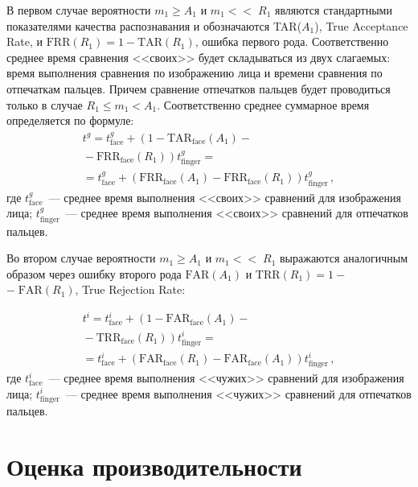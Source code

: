 \begin{multicols}{2}
     В первом случае вероятности $m_1\geq A_1$ и $m_1 <$\linebreak $<\;R_1$ являются
стандартными показателями качества распознавания и обозначаются TAR($A_1$), True
Acceptance Rate, и $\mathrm{FRR}(R_1)=1 - \mathrm{TAR}(R_1)$, 
ошибка первого рода. Соответственно среднее время сравнения <<своих>> будет
складываться из двух слагаемых: время выполнения сравнения по изображению лица и
времени сравнения по отпечаткам пальцев. Причем сравнение отпечатков пальцев
будет проводиться только в случае $R_1 \leq m_1 < A_1$. Соответственно среднее
суммарное время определяется по формуле:
\begin{multline}
 t^g = t^g_{\mathrm{face}} +\left ( 1-\mathrm{TAR}_{\mathrm{face}} (A_1) -{}\right.\\
 {}-\left.
\mathrm{FRR}_{\mathrm{face}} (R_1 )\right )  t^g_{\mathrm{finger}} ={}\\
     {}= t^g_{\mathrm{face}} +\left ( \mathrm{FRR}_{\mathrm{face}} (A_1) -
\mathrm{FRR}_{\mathrm{face}} (R_1)\right ) t^g_{\mathrm{finger}}\,,
     \label{e4ush}
     \end{multline}
где $t^g_{\mathrm{face}}$~--- среднее время выполнения <<своих>> сравнений для
изображения лица; $t^g_{\mathrm{finger}}$~---  среднее время выполнения <<своих>>
сравнений для отпечатков пальцев.


     Во втором случае вероятности $m_1 \geq A_1$ и $m_1<$\linebreak $<\;R_1$ выражаются
аналогичным образом \mbox{через} ошибку второго рода $\mathrm{FAR}(A_1)$ и $\mathrm{TRR}(R_1)=1-$\linebreak
$-\;\mathrm{FAR}(R_1)$, True Rejection Rate:

\noindent
\begin{multline}
     t^i =  t^i_{\mathrm{face}} +\left (1-\mathrm{FAR}_{\mathrm{face}}(A_1)-{}\right.\\
\left. {}-\mathrm{TRR}_{\mathrm{face}}(R_1)\right ) t^i_{\mathrm{finger}} ={}\\
     {}=
     t^i_{\mathrm{face}} + \left ( \mathrm{FAR}_{\mathrm{face}}(R_1)-
\mathrm{FAR}_{\mathrm{face}}(A_1)\right ) t^i_{\mathrm{finger}}\,,
     \label{e5ush}
     \end{multline}
где $t^i_{\mathrm{face}}$~--- среднее время выполнения <<чужих>> сравнений для
изображения лица; $t^i_{\mathrm{finger}}$~--- среднее время выполнения <<чужих>>
сравнений для отпечатков пальцев.

\section{Оценка производительности}


\end{multicols}
